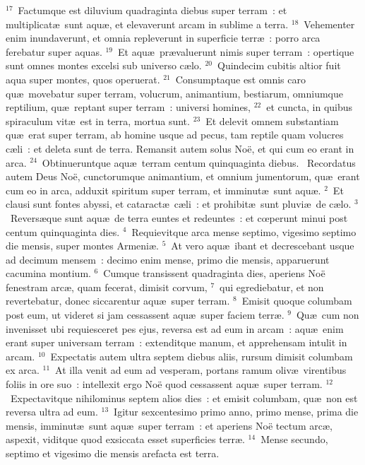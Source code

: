 ${}^{17}$~Factumque est diluvium quadraginta diebus super terram~: et multiplicat\ae\ sunt aqu\ae , et elevaverunt arcam in sublime a terra.
${}^{18}$~Vehementer enim inundaverunt, et omnia repleverunt in superficie terr\ae~: porro arca ferebatur super aquas.
${}^{19}$~Et aqu\ae\ pr\ae valuerunt nimis super terram~: opertique sunt omnes montes excelsi sub universo c\ae lo.
${}^{20}$~Quindecim cubitis altior fuit aqua super montes, quos operuerat.
${}^{21}$~Consumptaque est omnis caro qu\ae\ movebatur super terram, volucrum, animantium, bestiarum, omniumque reptilium, qu\ae\ reptant super terram~: universi homines,
${}^{22}$~et cuncta, in quibus spiraculum vit\ae\ est in terra, mortua sunt.
${}^{23}$~Et delevit omnem substantiam qu\ae\ erat super terram, ab homine usque ad pecus, tam reptile quam volucres c\ae li~: et deleta sunt de terra. Remansit autem solus No\"e, et qui cum eo erant in arca.
${}^{24}$~Obtinueruntque aqu\ae\ terram centum quinquaginta diebus.
~Recordatus autem Deus No\"e, cunctorumque animantium, et omnium jumentorum, qu\ae\ erant cum eo in arca, adduxit spiritum super terram, et imminut\ae\ sunt aqu\ae .
${}^{2}$~Et clausi sunt fontes abyssi, et cataract\ae\ c\ae li~: et prohibit\ae\ sunt pluvi\ae\ de c\ae lo.
${}^{3}$~Revers\ae que sunt aqu\ae\ de terra euntes et redeuntes~: et cœperunt minui post centum quinquaginta dies.
${}^{4}$~Requievitque arca mense septimo, vigesimo septimo die mensis, super montes Armeni\ae .
${}^{5}$~At vero aqu\ae\ ibant et decrescebant usque ad decimum mensem~: decimo enim mense, primo die mensis, apparuerunt cacumina montium.
${}^{6}$~Cumque transissent quadraginta dies, aperiens No\"e fenestram arc\ae , quam fecerat, dimisit corvum,
${}^{7}$~qui egrediebatur, et non revertebatur, donec siccarentur aqu\ae\ super terram.
${}^{8}$~Emisit quoque columbam post eum, ut videret si jam cessassent aqu\ae\ super faciem terr\ae .
${}^{9}$~Qu\ae\ cum non invenisset ubi requiesceret pes ejus, reversa est ad eum in arcam~: aqu\ae\ enim erant super universam terram~: extenditque manum, et apprehensam intulit in arcam.
${}^{10}$~Expectatis autem ultra septem diebus aliis, rursum dimisit columbam ex arca.
${}^{11}$~At illa venit ad eum ad vesperam, portans ramum oliv\ae\ virentibus foliis in ore suo~: intellexit ergo No\"e quod cessassent aqu\ae\ super terram.
${}^{12}$~Expectavitque nihilominus septem alios dies~: et emisit columbam, qu\ae\ non est reversa ultra ad eum.
${}^{13}$~Igitur sexcentesimo primo anno, primo mense, prima die mensis, imminut\ae\ sunt aqu\ae\ super terram~: et aperiens No\"e tectum arc\ae , aspexit, viditque quod exsiccata esset superficies terr\ae .
${}^{14}$~Mense secundo, septimo et vigesimo die mensis arefacta est terra.


